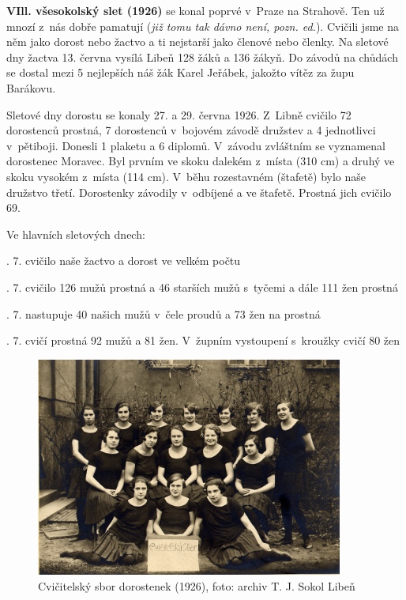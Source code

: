 \documentclass[a5paper, 11pt, twoside]{article}
\begin{document}
\textbf{VIll. všesokolský slet (1926)} se konal poprvé v~Praze na
Strahově. Ten už mnozí z~nás dobře pamatují (\textit{již tomu tak dávno
není, pozn. ed.}). Cvičili jsme na něm jako dorost nebo žactvo a ti
nejstarší jako členové nebo členky. Na sletové dny žactva 13. června
vysílá Libeň 128 žáků a 136 žákyň. Do závodů na chůdách se dostal mezi 5
nejlepších náš žák Karel Jeřábek, jakožto vítěz za župu Barákovu.

Sletové dny dorostu se konaly 27. a 29. června 1926. Z~Libně cvičilo 72
dorostenců prostná, 7 dorostenců v~bojovém závodě družstev a 4
jednotlivci v~pětiboji. Donesli 1 plaketu a 6 diplomů. V~závodu
zvláštním se vyznamenal dorostenec Moravec. Byl prvním ve skoku dalekém
z~místa (310 cm) a druhý ve skoku vysokém z~místa (114 cm). V~běhu
rozestavném (štafetě) bylo naše družstvo třetí. Dorostenky závodily
v~odbíjené a ve štafetě. Prostná jich cvičilo 69.

Ve hlavních sletových dnech:
\vspace*{6pt}

. 7. cvičilo naše žactvo a dorost ve velkém počtu

. 7. cvičilo 126 mužů prostná a 46 starších mužů s~tyčemi a dále 111
žen prostná

. 7. nastupuje 40 našich mužů v~čele proudů a 73 žen na prostná

. 7. cvičí prostná 92 mužů a 81 žen. V~župním vystoupení s~kroužky
cvičí 80 žen
\vspace*{6pt}

\begin{figure}[h!]
  \centering 
  \includegraphics[width=0.9\textwidth]{img/27_dorostenky.jpg}
  \caption*{Cvičitelský sbor dorostenek (1926), foto: archiv T. J. Sokol
  Libeň}
\end{figure}
\end{document}
